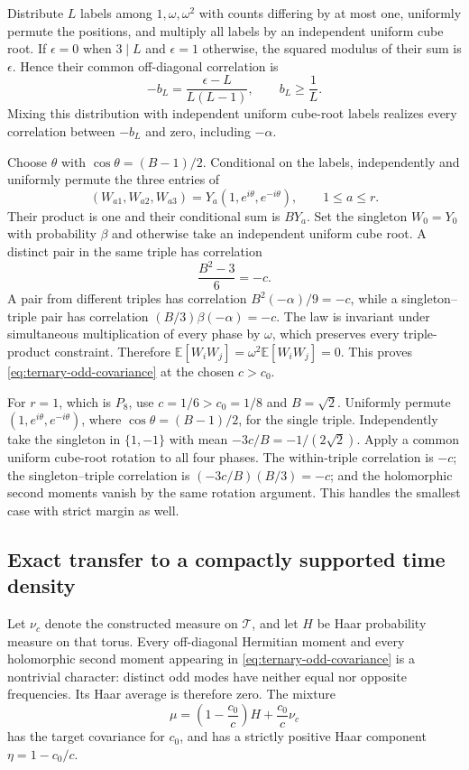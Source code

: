 \documentclass[11pt,a4paper]{article}
\theoremstyle{definition}\newtheorem{definition}[theorem]{Definition}
\theoremstyle{remark}\newtheorem{remark}[theorem]{Remark}
\begin{document}
Distribute $L$ labels among $1,\omega,\omega^2$ with counts differing
by at most one, uniformly permute the positions, and multiply all labels
by an independent uniform cube root. If $\epsilon=0$ when $3\mid L$
and $\epsilon=1$ otherwise, the squared modulus of their sum is
$\epsilon$. Hence their common off-diagonal correlation is
\[
 -b_L=\frac{\epsilon-L}{L(L-1)},\qquad
 b_L\ge\frac1L.
\]
Mixing this distribution with independent uniform cube-root labels
realizes every correlation between $-b_L$ and zero, including $-\alpha$.

Choose $\theta$ with $\cos\theta=(B-1)/2$. Conditional on the labels,
independently and uniformly permute the three entries of
\[
 (W_{a1},W_{a2},W_{a3})
   =Y_a(1,e^{i\theta},e^{-i\theta}),\qquad 1\le a\le r.
\]
Their product is one and their conditional sum is $BY_a$. Set the
singleton $W_0=Y_0$ with probability $\beta$ and otherwise take an
independent uniform cube root. A distinct pair in the same triple has
correlation
\[
 \frac{B^2-3}{6}=-c.
\]
A pair from different triples has correlation
\(B^2(-\alpha)/9=-c\), while a singleton--triple pair has correlation
\((B/3)\beta(-\alpha)=-c\). The law is invariant under simultaneous
multiplication of every phase by $\omega$, which preserves every
triple-product constraint. Therefore
\(\mathbb E[W_iW_j]=\omega^2\mathbb E[W_iW_j]=0\).
This proves \eqref{eq:ternary-odd-covariance} at the chosen $c>c_0$.

For $r=1$, which is $P_8$, use $c=1/6>c_0=1/8$ and $B=\sqrt2$.
Uniformly permute $(1,e^{i\theta},e^{-i\theta})$, where
$\cos\theta=(B-1)/2$, for the single triple. Independently take the
singleton in $\{1,-1\}$ with mean $-3c/B=-1/(2\sqrt2)$.
Apply a common uniform cube-root rotation to all four phases. The
within-triple correlation is $-c$; the singleton--triple correlation
is $(-3c/B)(B/3)=-c$; and the holomorphic second moments vanish
by the same rotation argument. This handles the smallest case with
strict margin as well.

\subsection{Exact transfer to a compactly supported time density}
Let $\nu_c$ denote the constructed measure on $\mathcal T$, and let
$H$ be Haar probability measure on that torus. Every off-diagonal
Hermitian moment and every holomorphic second moment appearing in
\eqref{eq:ternary-odd-covariance} is a nontrivial character: distinct
odd modes have neither equal nor opposite frequencies. Its Haar
average is therefore zero. The mixture
\[
 \mu=\left(1-\frac{c_0}{c}\right)H+\frac{c_0}{c}\nu_c
\]
has the target covariance for $c_0$, and has a strictly positive Haar
component $\eta=1-c_0/c$.
\end{document}
